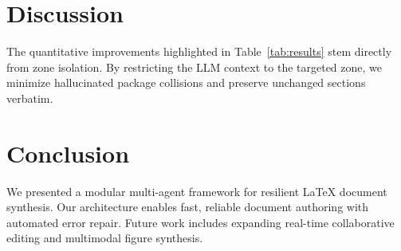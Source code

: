 \documentclass[10pt,twocolumn]{article}
\begin{document}
\section{Discussion}
The quantitative improvements highlighted in Table~\ref{tab:results} stem directly from zone isolation. By restricting the LLM context to the targeted zone, we minimize hallucinated package collisions and preserve unchanged sections verbatim.

\section{Conclusion}
We presented a modular multi-agent framework for resilient \LaTeX{} document synthesis. Our architecture enables fast, reliable document authoring with automated error repair. Future work includes expanding real-time collaborative editing and multimodal figure synthesis.

\end{document}
